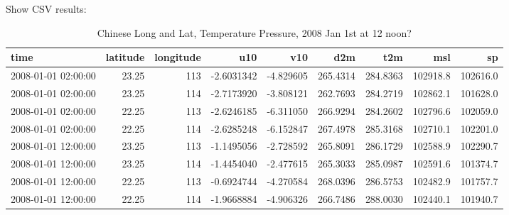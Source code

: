 \documentclass[
]{book}
\newenvironment{Shaded}{\begin{snugshade}}{\end{snugshade}}
\newcommand{\CommentTok}[1]{\textcolor[rgb]{0.56,0.35,0.01}{\textit{#1}}}
\newcommand{\DataTypeTok}[1]{\textcolor[rgb]{0.13,0.29,0.53}{#1}}
\newcommand{\DecValTok}[1]{\textcolor[rgb]{0.00,0.00,0.81}{#1}}
\newcommand{\KeywordTok}[1]{\textcolor[rgb]{0.13,0.29,0.53}{\textbf{#1}}}
\newcommand{\NormalTok}[1]{#1}
\newcommand{\OperatorTok}[1]{\textcolor[rgb]{0.81,0.36,0.00}{\textbf{#1}}}
\newcommand{\StringTok}[1]{\textcolor[rgb]{0.31,0.60,0.02}{#1}}
\begin{document}
Show CSV results:

\begin{Shaded}
\end{Shaded}

\begin{table}[!h]

\caption{\label{tab:unnamed-chunk-29}Chinese Long and Lat, Temperature Pressure, 2008 Jan 1st at 12 noon?}
\centering
\begin{tabular}[t]{l|r|r|r|r|r|r|r|r}
\hline
time & latitude & longitude & u10 & v10 & d2m & t2m & msl & sp\\
\hline
\rowcolor{gray!6}  2008-01-01 02:00:00 & 23.25 & 113 & -2.6031342 & -4.829605 & 265.4314 & 284.8363 & 102918.8 & 102616.0\\
\hline
2008-01-01 02:00:00 & 23.25 & 114 & -2.7173920 & -3.808121 & 262.7693 & 284.2719 & 102862.1 & 101628.0\\
\hline
\rowcolor{gray!6}  2008-01-01 02:00:00 & 22.25 & 113 & -2.6246185 & -6.311050 & 266.9294 & 284.2602 & 102796.6 & 102059.0\\
\hline
2008-01-01 02:00:00 & 22.25 & 114 & -2.6285248 & -6.152847 & 267.4978 & 285.3168 & 102710.1 & 102201.0\\
\hline
\rowcolor{gray!6}  2008-01-01 12:00:00 & 23.25 & 113 & -1.1495056 & -2.728592 & 265.8091 & 286.1729 & 102588.9 & 102290.7\\
\hline
2008-01-01 12:00:00 & 23.25 & 114 & -1.4454040 & -2.477615 & 265.3033 & 285.0987 & 102591.6 & 101374.7\\
\hline
\rowcolor{gray!6}  2008-01-01 12:00:00 & 22.25 & 113 & -0.6924744 & -4.270584 & 268.0396 & 286.5753 & 102482.9 & 101757.7\\
\hline
2008-01-01 12:00:00 & 22.25 & 114 & -1.9668884 & -4.906326 & 266.7486 & 288.0030 & 102440.1 & 101940.7\\
\hline
\end{tabular}
\end{table}
\end{document}
